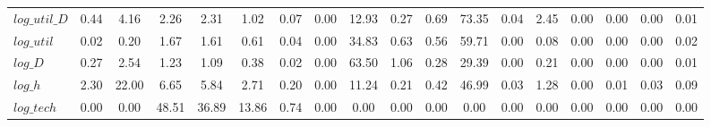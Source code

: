 \begin{center}
\begin{longtable}{lccccccccccccccccc}
$log\_util\_D   $	 & 	            0.44	 & 	            4.16	 & 	            2.26	 & 	            2.31	 & 	            1.02	 & 	            0.07	 & 	            0.00	 & 	           12.93	 & 	            0.27	 & 	            0.69	 & 	           73.35	 & 	            0.04	 & 	            2.45	 & 	            0.00	 & 	            0.00	 & 	            0.00	 & 	            0.01 \\ 
$log\_util      $	 & 	            0.02	 & 	            0.20	 & 	            1.67	 & 	            1.61	 & 	            0.61	 & 	            0.04	 & 	            0.00	 & 	           34.83	 & 	            0.63	 & 	            0.56	 & 	           59.71	 & 	            0.00	 & 	            0.08	 & 	            0.00	 & 	            0.00	 & 	            0.00	 & 	            0.02 \\ 
$log\_D         $	 & 	            0.27	 & 	            2.54	 & 	            1.23	 & 	            1.09	 & 	            0.38	 & 	            0.02	 & 	            0.00	 & 	           63.50	 & 	            1.06	 & 	            0.28	 & 	           29.39	 & 	            0.00	 & 	            0.21	 & 	            0.00	 & 	            0.00	 & 	            0.00	 & 	            0.01 \\ 
$log\_h         $	 & 	            2.30	 & 	           22.00	 & 	            6.65	 & 	            5.84	 & 	            2.71	 & 	            0.20	 & 	            0.00	 & 	           11.24	 & 	            0.21	 & 	            0.42	 & 	           46.99	 & 	            0.03	 & 	            1.28	 & 	            0.00	 & 	            0.01	 & 	            0.03	 & 	            0.09 \\ 
$log\_tech      $	 & 	            0.00	 & 	            0.00	 & 	           48.51	 & 	           36.89	 & 	           13.86	 & 	            0.74	 & 	            0.00	 & 	            0.00	 & 	            0.00	 & 	            0.00	 & 	            0.00	 & 	            0.00	 & 	            0.00	 & 	            0.00	 & 	            0.00	 & 	            0.00	 & 	            0.00 \\ 
\end{longtable}
 \end{center}

